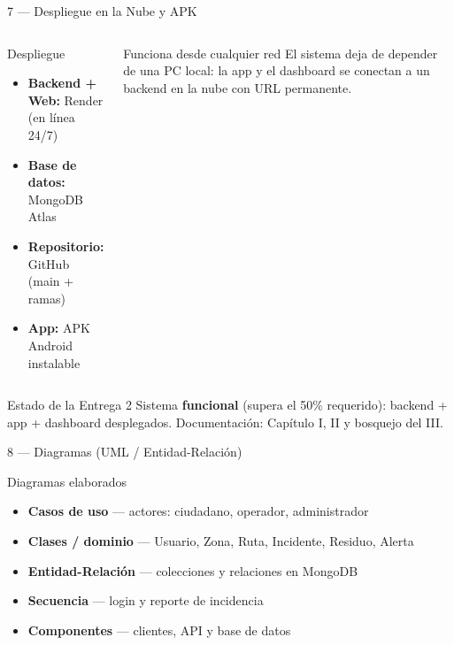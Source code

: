 \documentclass[aspectratio=169, 11pt]{beamer}
\begin{document}
\begin{frame}{7 — Despliegue en la Nube y APK}
    \vspace{-0.3cm}
    \begin{columns}[T]
    \begin{block}{Despliegue}
        \footnotesize
        \begin{itemize}
            \item \textbf{Backend + Web:} Render (en línea 24/7)
            \item \textbf{Base de datos:} MongoDB Atlas
            \item \textbf{Repositorio:} GitHub (main + ramas)
            \item \textbf{App:} APK Android instalable
        \end{itemize}
    \end{block}

    \begin{block}{Funciona desde cualquier red}
        \footnotesize
        El sistema deja de depender de una PC local: la app y el dashboard se conectan a un backend en la nube con URL permanente.
    \end{block}
    \end{columns}
    \vspace{0.1cm}
    \begin{block}{Estado de la Entrega 2}
        \footnotesize
        Sistema \textbf{funcional} (supera el 50\% requerido): backend + app + dashboard desplegados. Documentación: Capítulo I, II y bosquejo del III.
    \end{block}
\end{frame}

\begin{frame}{8 — Diagramas (UML / Entidad-Relación)}
    \vspace{-0.2cm}
    \begin{block}{Diagramas elaborados}
        \footnotesize
        \begin{itemize}
            \item \textbf{Casos de uso} — actores: ciudadano, operador, administrador
            \item \textbf{Clases / dominio} — Usuario, Zona, Ruta, Incidente, Residuo, Alerta
            \item \textbf{Entidad-Relación} — colecciones y relaciones en MongoDB
            \item \textbf{Secuencia} — login y reporte de incidencia
            \item \textbf{Componentes} — clientes, API y base de datos
        \end{itemize}
    \end{block}
\end{frame}
\end{document}
